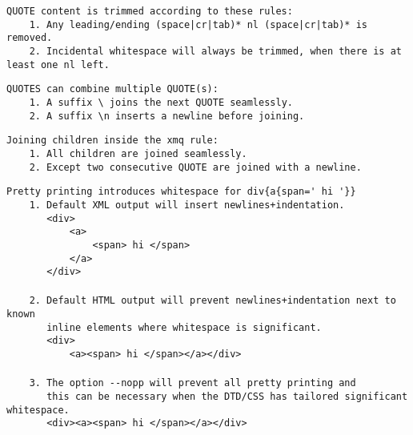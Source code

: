 \documentclass[10pt,a4paper]{article}
\begin{document}
\vspace{5mm}

\verb|QUOTE content is trimmed according to these rules:|\\
\verb!    1. Any leading/ending (space|cr|tab)* nl (space|cr|tab)* is removed.! \\
\verb|    2. Incidental whitespace will always be trimmed, when there is at least one nl left.|

\vspace{5mm}

\verb|QUOTES can combine multiple QUOTE(s):|\\
\verb|    1. A suffix \ joins the next QUOTE seamlessly.|\\
\verb|    2. A suffix \n inserts a newline before joining.|

\vspace{5mm}

\verb|Joining children inside the xmq rule:|\\
\verb|    1. All children are joined seamlessly.|\\
\verb|    2. Except two consecutive QUOTE are joined with a newline.|

\vspace{5mm}

\verb|Pretty printing introduces whitespace for div{a{span=' hi '}}|\\
\verb|    1. Default XML output will insert newlines+indentation.|\\
\verb|       <div>|\\
\verb|           <a>|\\
\verb|               <span> hi </span>|\\
\verb|           </a>|\\
\verb|       </div>|\\
\\
\verb|    2. Default HTML output will prevent newlines+indentation next to known|\\
\verb|       inline elements where whitespace is significant.|\\
\verb|       <div>|\\
\verb|           <a><span> hi </span></a></div>|\\
\\
\verb|    3. The option --nopp will prevent all pretty printing and|\\
\verb|       this can be necessary when the DTD/CSS has tailored significant whitespace.|\\
\verb|       <div><a><span> hi </span></a></div>|\\
\end{document}
